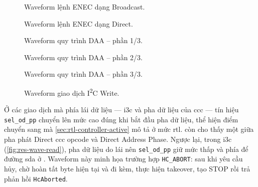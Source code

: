 \begin{figure}[!htbp]
	\centering
	
	\caption{Waveform lệnh ENEC dạng Broadcast.}
	\label{fig:res-enec-bcast}
\end{figure}

\begin{figure}[!htbp]
	\centering
	
	\caption{Waveform lệnh ENEC dạng Direct.}
	\label{fig:res-enec-direct}
\end{figure}

\begin{figure}[!htbp]
	\centering
	
	\caption{Waveform quy trình DAA -- phần 1/3.}
	\label{fig:res-daa-1}
\end{figure}

\begin{figure}[!htbp]
	\centering
	
	\caption{Waveform quy trình DAA -- phần 2/3.}
	\label{fig:res-daa-2}
\end{figure}

\begin{figure}[!htbp]
	\centering
	
	\caption{Waveform quy trình DAA -- phần 3/3.}
	\label{fig:res-daa-3}
\end{figure}

\begin{figure}[!htbp]
	\centering
	
	\caption{Waveform giao dịch I\textsuperscript{2}C Write.}
	\label{fig:res-i2c-write}
\end{figure}

Ở các giao dịch mà phía \Controller{} lái dữ liệu --- \gls{i3c} \PrivateWrite{} và pha dữ liệu của \gls{ccc}
--- tín hiệu \texttt{sel\_od\_pp} chuyển lên mức
cao đúng khi bắt đầu pha dữ liệu, thể hiện điểm chuyển \OpenDrain{} sang \PushPull{} mà
\cref{sec:rtl-controller-active} mô tả ở mức \gls{rtl}.  còn cho thấy một
\RepeatedSTART{} giữa pha phát Direct \gls{ccc} opcode và Direct Address Phase. Ngược lại, trong \gls{i3c}
\PrivateRead{} (\cref{fig:res-wave-read}), pha dữ liệu do \Target{} lái nên
\texttt{sel\_od\_pp} giữ mức thấp và phía \Controller{} để đường \gls{sda} ở \OpenDrain{}. Waveform này
minh họa trường hợp \texttt{HC\_ABORT}: sau khi \Host{} yêu cầu hủy, \Controller{} chờ hoàn tất byte
hiện tại và \TBit{} đi kèm, thực hiện takeover, tạo STOP rồi trả phản hồi \texttt{HcAborted}.


